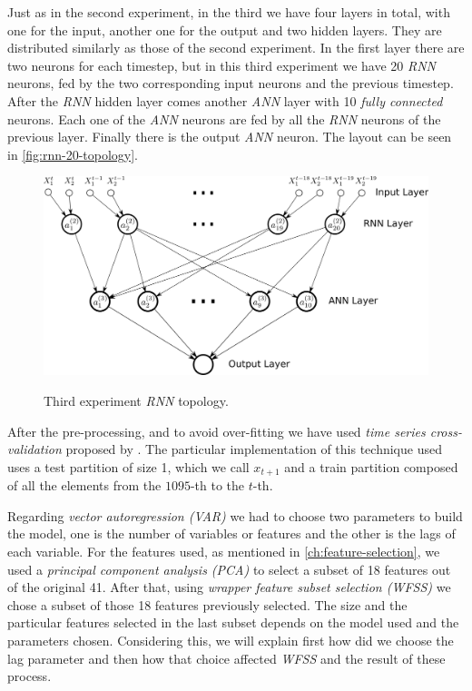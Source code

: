 Just as in the second experiment, in the third we have four layers in
total, with one for the input, another one for the output and two
hidden layers. They are distributed similarly as those of the second
experiment. In the first layer there are two neurons for each
timestep, but in this third experiment we have 20 \textit{RNN}
neurons, fed by the two corresponding input neurons and the previous
timestep. After the \textit{RNN} hidden layer comes another
\textit{ANN} layer with 10 \textit{fully connected} neurons. Each one
of the \textit{ANN} neurons are fed by all the \textit{RNN} neurons of
the previous layer. Finally there is the output \textit{ANN} neuron.
The layout can be seen in \autoref{fig:rnn-20-topology}.

\begin{figure}[bth]
  \myfloatalign
  {
    \includegraphics[width=1\linewidth]
    {gfx/rnn_20_topology}}
  \caption{Third experiment \textit{RNN} topology.}
  \label{fig:rnn-20-topology}
\end{figure}

After the pre-processing, and to avoid over-fitting we have used
\textit{time series cross-validation} proposed by
\cite{robjhyndman2010}. The particular implementation of this
technique used uses a test partition of size 1, which we call $x_{t +
1}$ and a train partition composed of all the elements from the
$1095$-th to the $t$-th.


Regarding \textit{vector autoregression (VAR)} we had to choose two
parameters to build the model, one is the number of variables or
features and the other is the lags of each variable. For the features
used, as mentioned in \autoref{ch:feature-selection}, we used a
\textit{principal component analysis (PCA)} to select a subset of 18
features out of the original 41. After that, using \textit{wrapper
feature subset selection (WFSS)} we chose a subset of those 18
features previously selected. The size and the particular features
selected in the last subset depends on the model used and the
parameters chosen. Considering this, we will explain first how did we
choose the lag parameter and then how that choice affected
\textit{WFSS} and the result of these process.

